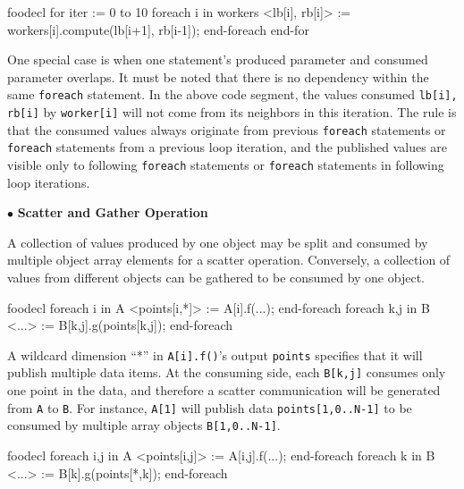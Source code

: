 \documentclass[10pt]{article}
\def\smallfbox#1{{\small \fbox{#1}}}
\def\code#1{{\small {\tt {#1}}}}
\begin{document}
\begin{SaveVerbatim}{foodecl}
  for iter := 0 to 10
    foreach i in workers
      <lb[i], rb[i]> := workers[i].compute(lb[i+1], rb[i-1]);
    end-foreach
  end-for
\end{SaveVerbatim}
\vspace{0.1in}
\smallfbox{\BUseVerbatim{foodecl}}
\vspace{0.1in}

One special case is when one statement's produced parameter and consumed
parameter overlaps. It must be noted that there is no dependency within the same
\code{foreach} statement. In the above code segment, the values consumed
\code{lb[i], rb[i]} by \code{worker[i]} will not come from  
its neighbors in this iteration. The rule is that the consumed values always
originate from previous \code{foreach} statements or \code{foreach} statements
from a previous loop iteration, and the published values are visible only to
following \code{foreach} statements or \code{foreach} statements in following
loop iterations. 

$\bullet$ {\bf Scatter and Gather Operation}

A collection of values produced by one object may be split and consumed by
multiple object array elements for a scatter operation. Conversely, a collection
of values from different objects can be gathered to be consumed by one object.

\begin{SaveVerbatim}{foodecl}
  foreach i in A
    <points[i,*]> := A[i].f(...);
  end-foreach
  foreach k,j in B
    <...> := B[k,j].g(points[k,j]);
  end-foreach
\end{SaveVerbatim}
\vspace{0.1in}
\smallfbox{\BUseVerbatim{foodecl}}
\vspace{0.1in}

A wildcard dimension ``*'' in \code{A[i].f()}'s output \code{points} specifies
that it will publish multiple data items. At the consuming side, each
\code{B[k,j]} consumes only one point in the data, and therefore a scatter
communication will be generated from \code{A} to \code{B}. For instance,
\code{A[1]} will publish data \code{points[1,0..N-1]} to be consumed by multiple
array objects \code{B[1,0..N-1]}.  

\begin{SaveVerbatim}{foodecl}
  foreach i,j in A
    <points[i,j]> := A[i,j].f(...);
  end-foreach
  foreach k in B
    <...> := B[k].g(points[*,k]);
  end-foreach
\end{SaveVerbatim}
\vspace{0.1in}
\smallfbox{\BUseVerbatim{foodecl}}
\vspace{0.1in}
\end{document}
